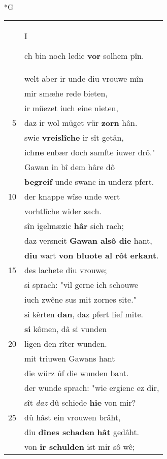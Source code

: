 \documentclass[8pt,a4paper,notitlepage]{article}
\begin{document}
\begin{table}[ht]
\begin{minipage}[t]{0.5\linewidth}
\small
\begin{center}*G
\end{center}
\begin{tabular}{rl}
 & \begin{large}I\end{large}ch bin noch ledic \textbf{vor} solhem pîn.\\ 
 & welt aber ir unde diu vrouwe mîn\\ 
 & mir smæhe rede bieten,\\ 
 & ir müezet iuch eine nieten,\\ 
5 & daz ir wol müget vür \textbf{zorn} hân.\\ 
 & swie \textbf{vreislîche} ir sît getân,\\ 
 & ich\textbf{ne} enbær doch samfte iuwer drô."\\ 
 & Gawan in bî dem hâre dô\\ 
 & \textbf{begreif} unde swanc in underz pfert.\\ 
10 & der knappe wîse unde wert\\ 
 & vorhtlîche wider sach.\\ 
 & sîn igelmæzic \textbf{hâr} sich rach;\\ 
 & daz versneit \textbf{Gawan alsô die} hant,\\ 
 & \textbf{diu} wart \textbf{von bluote al rôt} \textbf{erkant}.\\ 
15 & des lachete diu vrouwe;\\ 
 & si sprach: "vil gerne ich schouwe\\ 
 & iuch zwêne sus mit zornes site."\\ 
 & si kêrten \textbf{dan}, daz pfert lief mite.\\ 
 & \textbf{si} kômen, dâ si vunden\\ 
20 & ligen den rîter wunden.\\ 
 & mit triuwen Gawans hant\\ 
 & die würz ûf die wunden bant.\\ 
 & der wunde sprach: "wie ergienc ez dir,\\ 
 & sît \textit{daz} dû schiede \textbf{hie} von mir?\\ 
25 & dû hâst ein vrouwen brâht,\\ 
 & diu \textbf{dînes schaden} \textbf{hât} gedâht.\\ 
 & von \textbf{ir schulden} ist mir sô wê;\\ 

\end{tabular}
\end{minipage}
\end{table}
\end{document}
